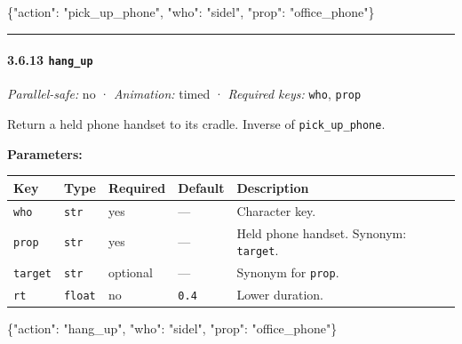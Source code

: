 \documentclass[
  12pt,
  letterpaper,
]{book}
\newenvironment{Shaded}{}{}
\newcommand{\DataTypeTok}[1]{\textcolor[rgb]{0.56,0.13,0.00}{#1}}
\newcommand{\FunctionTok}[1]{\textcolor[rgb]{0.02,0.16,0.49}{#1}}
\newcommand{\StringTok}[1]{\textcolor[rgb]{0.25,0.44,0.63}{#1}}
\begin{document}
\begin{Shaded}
\begin{Highlighting}[]
\FunctionTok{\{}\DataTypeTok{"action"}\FunctionTok{:} \StringTok{"pick\_up\_phone"}\FunctionTok{,} \DataTypeTok{"who"}\FunctionTok{:} \StringTok{"sidel"}\FunctionTok{,} \DataTypeTok{"prop"}\FunctionTok{:} \StringTok{"office\_phone"}\FunctionTok{\}}
\end{Highlighting}
\end{Shaded}

\begin{center}\rule{0.5\linewidth}{0.5pt}\end{center}

\paragraph{\texorpdfstring{3.6.13
\texttt{hang\_up}}{3.6.13 hang\_up}}\label{hang_up}

\emph{Parallel-safe:} no · \emph{Animation:} timed · \emph{Required
keys:} \texttt{who}, \texttt{prop}

Return a held phone handset to its cradle. Inverse of
\texttt{pick\_up\_phone}.

\textbf{Parameters:}

\begin{longtable}[]{@{}lllll@{}}
\toprule\noalign{}
Key & Type & Required & Default & Description \\
\midrule\noalign{}
\endhead
\bottomrule\noalign{}
\endlastfoot
\texttt{who} & \texttt{str} & yes & --- & Character key. \\
\texttt{prop} & \texttt{str} & yes & --- & Held phone handset. Synonym:
\texttt{target}. \\
\texttt{target} & \texttt{str} & optional & --- & Synonym for
\texttt{prop}. \\
\texttt{rt} & \texttt{float} & no & \texttt{0.4} & Lower duration. \\
\end{longtable}

\begin{Shaded}
\begin{Highlighting}[]
\FunctionTok{\{}\DataTypeTok{"action"}\FunctionTok{:} \StringTok{"hang\_up"}\FunctionTok{,} \DataTypeTok{"who"}\FunctionTok{:} \StringTok{"sidel"}\FunctionTok{,} \DataTypeTok{"prop"}\FunctionTok{:} \StringTok{"office\_phone"}\FunctionTok{\}}
\end{Highlighting}
\end{Shaded}
\end{document}
